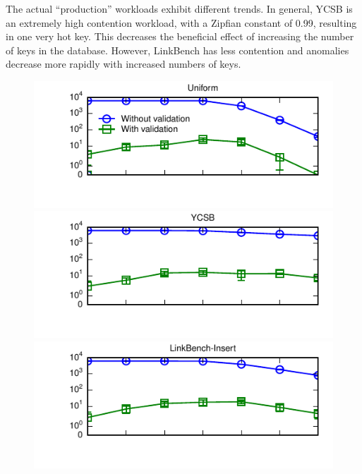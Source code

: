 The actual ``production'' workloads exhibit different trends. In
general, YCSB is an extremely high contention workload, with a Zipfian
constant of 0.99, resulting in one very hot key. This decreases the
beneficial effect of increasing the number of keys in the
database. However, LinkBench has less contention and anomalies decrease more
rapidly with increased numbers of keys.

\begin{figure}
 \begin{adjustwidth}{-2em}{}
\includegraphics[width=1.08\columnwidth]{figs/pk-workload-uniform-violations.pdf}\vspace{-2em}
\includegraphics[width=1.08\columnwidth]{figs/pk-workload-ycsb-violations.pdf}\vspace{-2em}
\includegraphics[width=1.08\columnwidth]{figs/pk-workload-linkbench-ins-violations.pdf}\vspace{-2em}

\end{adjustwidth}
\end{figure}
